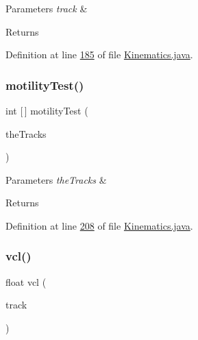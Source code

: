 \begin{DoxyParams}{Parameters}
{\em track} & \\
\hline
\end{DoxyParams}
\begin{DoxyReturn}{Returns}

\end{DoxyReturn}


Definition at line \hyperlink{_kinematics_8java_source_l00185}{185} of file \hyperlink{_kinematics_8java_source}{Kinematics.\+java}.

\hypertarget{classfunctions_1_1_kinematics_a0bde63a25091ffc7c7af6d9fffe78034}{}\label{classfunctions_1_1_kinematics_a0bde63a25091ffc7c7af6d9fffe78034} 
\subsubsection{\texorpdfstring{motility\+Test()}{motilityTest()}\hspace{0.1cm}{\footnotesize\ttfamily [2/2]}}
{\footnotesize\ttfamily int \mbox{[}$\,$\mbox{]} motility\+Test (\begin{DoxyParamCaption}\item[{\hyperlink{classdata_1_1_serializable_list}{Serializable\+List}}]{the\+Tracks }\end{DoxyParamCaption})}


\begin{DoxyParams}{Parameters}
{\em the\+Tracks} & \\
\hline
\end{DoxyParams}
\begin{DoxyReturn}{Returns}

\end{DoxyReturn}


Definition at line \hyperlink{_kinematics_8java_source_l00208}{208} of file \hyperlink{_kinematics_8java_source}{Kinematics.\+java}.

\hypertarget{classfunctions_1_1_kinematics_af6e1e75567a927a9c627616cb68b0d7f}{}\label{classfunctions_1_1_kinematics_af6e1e75567a927a9c627616cb68b0d7f} 
\subsubsection{\texorpdfstring{vcl()}{vcl()}}
{\footnotesize\ttfamily float vcl (\begin{DoxyParamCaption}\item[{List}]{track }\end{DoxyParamCaption})}


